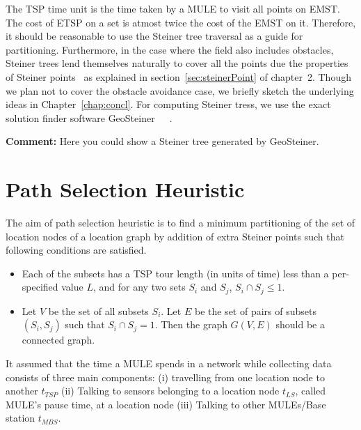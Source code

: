 The TSP time unit is the time taken by a MULE to visit all points on EMST. The cost of ETSP on a set is atmost twice the cost of the EMST on it. Therefore, it should be reasonable to use the Steiner tree traversal as a guide for partitioning. Furthermore, in the case where the field also includes obstacles, Steiner trees lend themselves naturally to cover all the points due the properties of Steiner points~\cite{oaest99} as explained in section~\ref{sec:steinerPoint} of chapter~2. Though we plan not to cover the obstacle avoidance case, we briefly sketch the underlying ideas in Chapter~\ref{chap:concl}. For computing Steiner tress, we use the exact solution finder software GeoSteiner~\cite{geosteiner1}~\cite{geosteiner2}~\cite{geosteiner3}. 

{\bf Comment:} Here you could show a Steiner tree generated by
GeoSteiner. 

\section{Path Selection Heuristic}

The aim of path selection heuristic is to find a minimum partitioning of
the set of location nodes of a location graph by addition of 
extra Steiner points such that following conditions are satisfied.

\begin{itemize}
\item Each of the subsets has a TSP tour length (in units of time) less than a per-specified value $L$, and for any two sets $S_{i}$ and $S_{j}$, $S_{i} \cap S_{j} \le 1$.
\item Let $V$ be the set of all subsets $S_{i}$. Let $E$ be the set of pairs of subsets $(S_{i},S_{j})$ such that $S_{i} \cap S_{j} = 1$. Then the graph $G(V,E)$ should be a connected graph.
\end{itemize}

It assumed that the time a MULE spends in a network while collecting data
consists of three main components: (i) travelling from one location node to another $t_{TSP}$ (ii) Talking to sensors belonging to a location node $t_{LS}$, called MULE's pause time, at a location node (iii) Talking to other MULEs/Base station $t_{MBS}$.

